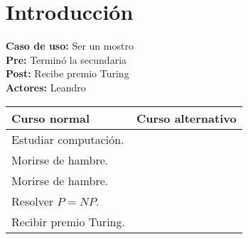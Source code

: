 \documentclass[a4paper, 10pt, twoside]{article}
\begin{document}
\tableofcontents

\newpage




\section{Introducción}



\newcommand{\ucname}[1]{\renewcommand{\givenucname}{#1}}
\newcommand{\ucpre}[1]{\renewcommand{\givenucpre}{#1}}
\newcommand{\ucpost}[1]{\renewcommand{\givenucpost}{#1}}
\newcommand{\ucactor}[1]{\renewcommand{\givenucactor}{#1}}
\newcommand{\givenucname}{REQUIRED!}
\newcommand{\givenucpre}{REQUIRED!}
\newcommand{\givenucpost}{REQUIRED!}
\newcommand{\givenucactor}{REQUIRED!}

\newenvironment{usecase}
  {}{
    \textbf{Caso de uso: }\givenucname \\
    \textbf{Pre: }\givenucpre \\
    \textbf{Post: }\givenucpost \\
    \textbf{Actores: }\givenucactor
  }

\newenvironment{usecasesteps}
  {
    \setcounter{usecasecounter}{0}
    \setcounter{usecasealtcounter}{0}

    \begin{tabular}{|l|l|}
    \hline
    Curso normal & Curso alternativo \\
    \hline
    \hline
  }{
    \end{tabular}
  }

\newcommand{\ucstep}[2]{
  \stepcounter{usecasecounter}%
  \makebox[2ex][l]{\arabic{usecasecounter}.} #1 & \pbox[t]{5cm}{\setcounter{usecasealtcounter}{0} #2} \\
  \hline
}

\newcommand{\ucalt}[1]{
  \stepcounter{usecasealtcounter}
  \makebox[4ex][l]{\arabic{usecasecounter}.\arabic{usecasealtcounter}.}
  #1
}

\begin{usecase}
  \ucpre{Terminó la secundaria}
  \ucpost{Recibe premio Turing}
  \ucname{Ser un mostro}
  \ucactor{Leandro}
\end{usecase}
\begin{usecasesteps}
  \ucstep{Estudiar computación.}
         {\ucalt{Dedicarse a bellas artes.} \\
          \ucalt{Morirse de hambre.} \\
          \ucalt{Morirse de hambre.}}
  \ucstep{Resolver $P=NP$.}
         {\ucalt{Trabajar en otro problema.}}
  \ucstep{Recibir premio Turing.}{}
\end{usecasesteps}
\end{document}

